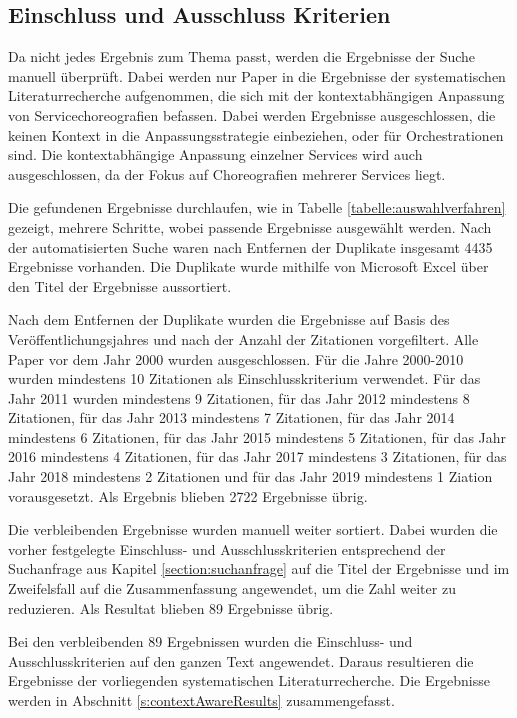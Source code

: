 \documentclass[conference,compsoc,ngerman]{IEEEtran}
\begin{document}
\subsection{Einschluss und Ausschluss Kriterien}
Da nicht jedes Ergebnis zum Thema passt, werden die Ergebnisse der Suche manuell überprüft. Dabei werden nur Paper in die Ergebnisse der systematischen Literaturrecherche aufgenommen, die sich mit der kontextabhängigen Anpassung von Servicechoreografien befassen. Dabei werden Ergebnisse ausgeschlossen, die keinen Kontext in die Anpassungsstrategie einbeziehen, oder für Orchestrationen sind. Die kontextabhängige Anpassung einzelner Services wird auch ausgeschlossen, da der Fokus auf Choreografien mehrerer Services liegt.

Die gefundenen Ergebnisse durchlaufen, wie in Tabelle \ref{tabelle:auswahlverfahren} gezeigt, mehrere Schritte, wobei passende Ergebnisse ausgewählt werden. Nach der automatisierten Suche waren nach Entfernen der Duplikate insgesamt 4435 Ergebnisse vorhanden. Die Duplikate wurde mithilfe von Microsoft Excel über den Titel der Ergebnisse aussortiert.

Nach dem Entfernen der Duplikate wurden die Ergebnisse auf Basis des Veröffentlichungsjahres und nach der Anzahl der Zitationen vorgefiltert.
Alle Paper vor dem Jahr 2000 wurden ausgeschlossen. Für die Jahre 2000-2010 wurden mindestens 10 Zitationen als Einschlusskriterium verwendet. Für das Jahr 2011 wurden mindestens 9 Zitationen, für das Jahr 2012 mindestens 8 Zitationen, für das Jahr 2013 mindestens 7 Zitationen, für das Jahr 2014 mindestens 6 Zitationen, für das Jahr 2015 mindestens 5 Zitationen, für das Jahr 2016 mindestens 4 Zitationen, für das Jahr 2017 mindestens 3 Zitationen, für das Jahr 2018 mindestens 2 Zitationen und für das Jahr 2019 mindestens 1 Ziation vorausgesetzt. Als Ergebnis blieben 2722 Ergebnisse übrig.

Die verbleibenden Ergebnisse wurden manuell weiter sortiert. Dabei wurden die vorher festgelegte Einschluss- und Ausschlusskriterien entsprechend der Suchanfrage aus Kapitel \ref{section:suchanfrage} auf die Titel der Ergebnisse und im Zweifelsfall auf die Zusammenfassung angewendet, um die Zahl weiter zu reduzieren. Als Resultat blieben 89 Ergebnisse übrig.

Bei den verbleibenden 89 Ergebnissen wurden die Einschluss- und Ausschlusskriterien auf den ganzen Text angewendet. Daraus resultieren die Ergebnisse der vorliegenden systematischen Literaturrecherche. Die Ergebnisse werden in Abschnitt \ref{s:contextAwareResults} zusammengefasst.
\end{document}
